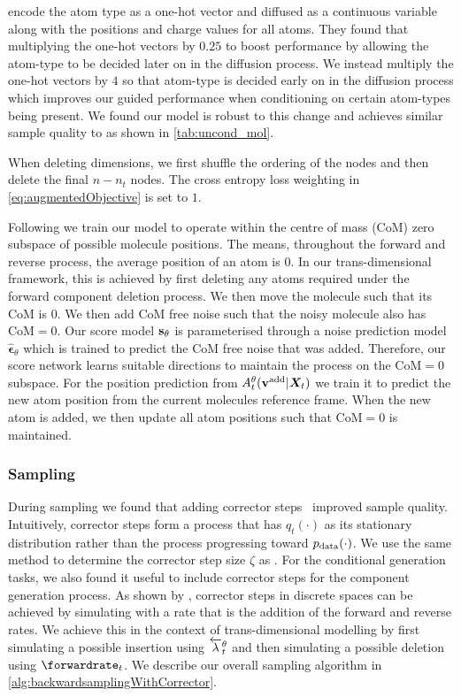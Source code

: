 \citet{hoogeboom2022equivariant} encode the atom type as a one-hot vector and diffused as a continuous variable along with the positions and charge values for all atoms. They found that multiplying the one-hot vectors by $0.25$ to boost performance by allowing the atom-type to be decided later on in the diffusion process. We instead multiply the one-hot vectors by $4$ so that atom-type is decided early on in the diffusion process which improves our guided performance when conditioning on certain atom-types being present. We found our model is robust to this change and achieves similar sample quality to \citet{hoogeboom2022equivariant} as shown in \cref{tab:uncond_mol}.

When deleting dimensions, we first shuffle the ordering of the nodes and then delete the final $n - n_t$ nodes. The cross entropy loss weighting in \cref{eq:augmentedObjective} is set to $1$.

Following \citet{hoogeboom2022equivariant} we train our model to operate within the centre of mass (CoM) zero subspace of possible molecule positions. The means, throughout the forward and reverse process, the average position of an atom is $0$. In our trans-dimensional framework, this is achieved by first deleting any atoms required under the forward component deletion process. We then move the molecule such that its CoM is $0$. We then add CoM free noise such that the noisy molecule also has CoM$=0$. Our score model ${\mathbf{s}}_\theta$ is parameterised through a noise prediction model $\hat{\mathbf{\epsilon}}_\theta$ which is trained to predict the CoM free noise that was added. Therefore, our score network learns suitable directions to maintain the process on the CoM$=0$ subspace. For the position prediction from $A_t^\theta({\mathbf{v}}^{\textup{add}} | {\bm{X}}_t)$ we train it to predict the new atom position from the current molecules reference frame. When the new atom is added, we then update all atom positions such that CoM$=0$ is maintained.

\subsubsection{Sampling}
During sampling we found that adding corrector steps~\citep{song2020score} improved sample quality. Intuitively, corrector steps form a process that has $q_t(\cdot)$ as its stationary distribution rather than the process progressing toward $p_{\rm{data}}(\cdot)$. We use the same method to determine the corrector step size $\zeta$ as \citet{song2020score}. For the conditional generation tasks, we also found it useful to include corrector steps for the component generation process. As shown by \citet{campbell2022continuous}, corrector steps in discrete spaces can be achieved by simulating with a rate that is the addition of the forward and reverse rates. We achieve this in the context of trans-dimensional modelling by first simulating a possible insertion using $\overleftarrow{\lambda}_t^\theta$ and then simulating a possible deletion using $\forwardrate_t$. We describe our overall sampling algorithm in \cref{alg:backwardsamplingWithCorrector}.

